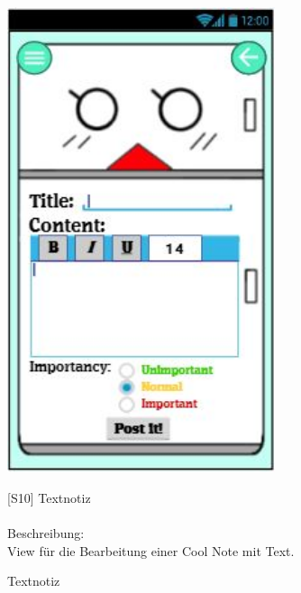 \documentclass[a4paper]{scrreprt}
\begin{document}
    	\begin{figure}[h!]
    		\begin{minipage}[t]{0.4\linewidth}
    			\flushright
    			\centering
    			\vspace{9mm}
    			\includegraphics[width=0.7\textwidth]{fridget_textnote.JPG}
    			\caption{Textnotiz}
    			\label{fig:figure1}
    		\end{minipage}
    		\hspace{0.5cm}
    		\begin{minipage}[t]{0.55\linewidth}
    			\flushleft
    			\vspace{9mm}
    			{[}S10{]} Textnotiz \\
    			\hfill
    			\\
    			Beschreibung: \\
    			View für die Bearbeitung einer Cool Note mit
    			Text.
    			 

\end{minipage}
\end{figure}
\end{document}
